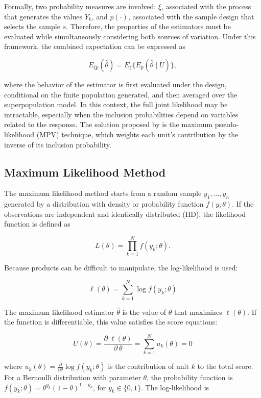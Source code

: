 \documentclass[
  english,
  12pt,
]{book}
\begin{document}
Formally, two probability measures are involved: \(\xi\), associated with the process that generates the values \(Y_k\), and \(p(\cdot)\), associated with the sample design that selects the sample \(s\). Therefore, the properties of the estimators must be evaluated while simultaneously considering both sources of variation. Under this framework, the combined expectation can be expressed as

\[
E_{\xi p}(\hat{\theta})
= E_{\xi}\{E_p(\hat{\theta}\mid U)\},
\]

where the behavior of the estimator is first evaluated under the design, conditional on the finite population generated, and then averaged over the superpopulation model. In this context, the full joint likelihood may be intractable, especially when the inclusion probabilities depend on variables related to the response. The solution proposed by \citet{pfeffermann1993role} is the maximum pseudo-likelihood (MPV) technique, which weights each unit's contribution by the inverse of its inclusion probability.

\subsection{Maximum Likelihood Method}\label{sec-mv}

The maximum likelihood method starts from a random sample \(y_1,\ldots,y_n\) generated by a distribution with density or probability function \(f(y;\theta)\). If the observations are independent and identically distributed (IID), the likelihood function is defined as

\[
L(\theta)
= \prod_{k=1}^{N} f(y_k;\theta).
\]

Because products can be difficult to manipulate, the log-likelihood is used:

\[
\ell(\theta)
= \sum_{k=1}^{N}\log f(y_k;\theta)
\]

The maximum likelihood estimator \(\hat{\theta}\) is the value of \(\theta\) that maximizes \(\ell(\theta)\). If the function is differentiable, this value satisfies the score equations:

\[
U(\theta)
= \frac{\partial \ \ell(\theta)}{\partial \ \theta}
= \sum_{k=1}^{N} u_k(\theta)
= 0
\]

where \(u_k(\theta) = \frac{\partial}{\partial\theta}\log f(y_k;\theta)\) is the contribution of unit \(k\) to the total score. For a Bernoulli distribution with parameter \(\theta\), the probability function is \(f(y_k;\theta) = \theta^{y_k}(1-\theta)^{1-y_k}\), for \(y_k \in \{0,1\}\). The log-likelihood is
\end{document}
